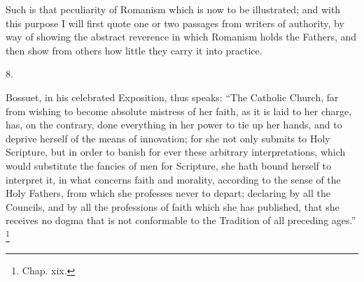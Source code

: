 Such is that peculiarity of Romanism which is now to be
illustrated; and with this purpose I will first quote one or two
passages from writers of authority, by way of showing the abstract
reverence in which Romanism holds the Fathers, and then show from
others how little they carry it into practice.

8.

Bossuet, in his celebrated Exposition, thus speaks: ``The
Catholic Church, far from wishing to become absolute mistress of her
faith, as it is laid to her charge, has, on the contrary, done
everything in her power to tie up her hands, and to deprive herself of
the means of innovation; for she not only submits to Holy Scripture,
but in order to banish for ever these arbitrary interpretations, which
would substitute the fancies of men for Scripture, she hath bound
herself to interpret it, in what concerns faith and morality,
according to the sense of the Holy Fathers, from which she professes
never to depart; declaring by all the Councils, and by all the
professions of faith which she has published, that she receives no
dogma that is not conformable to the Tradition of all preceding
ages.'' \footnote{Chap. xix.}

